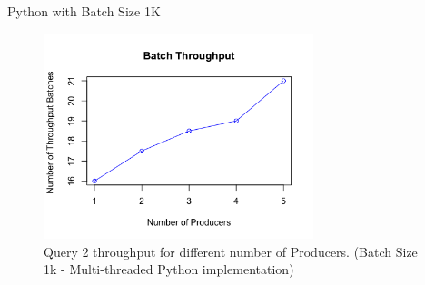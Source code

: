 \documentclass[9pt]{beamer}
\begin{document}

\begin{frame}[fragile]{Python with Batch Size 1K  }
    
    \begin{figure}
        \begin{center}
            \includegraphics[width=0.7\textwidth]{../paper/images/throughput.png}
            \caption{Query 2 throughput for different number of Producers. (Batch Size 1k - Multi-threaded Python implementation) }
            \label{fig:evaluation}
        \end{center}
    \end{figure}
\end{frame}






\end{document}
